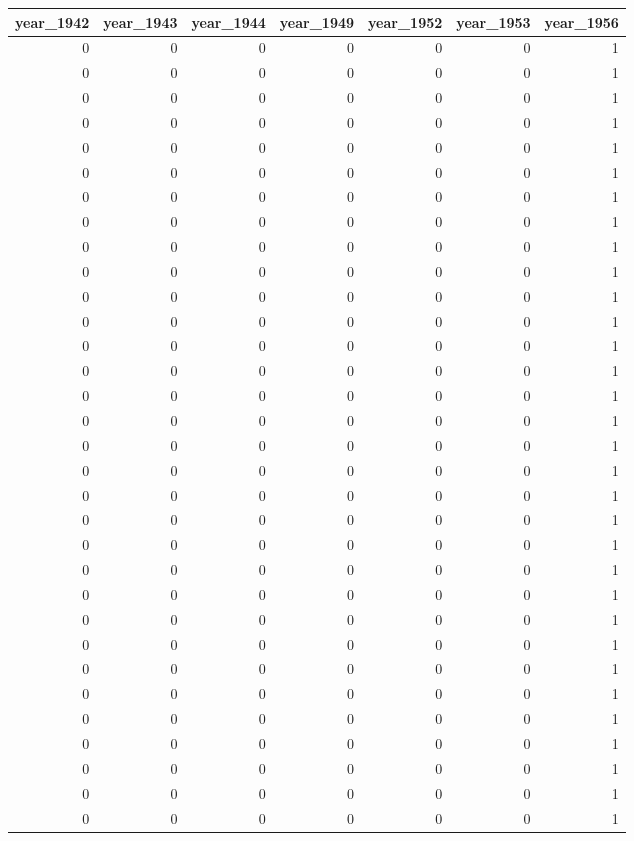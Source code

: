\documentclass[
  12pt,
]{krantz}
\begin{document}
\begin{tabular}{r|r|r|r|r|r|r}
\hline
year\_1942 & year\_1943 & year\_1944 & year\_1949 & year\_1952 & year\_1953 & year\_1956\\
\hline
0 & 0 & 0 & 0 & 0 & 0 & 1\\
\hline
0 & 0 & 0 & 0 & 0 & 0 & 1\\
\hline
0 & 0 & 0 & 0 & 0 & 0 & 1\\
\hline
0 & 0 & 0 & 0 & 0 & 0 & 1\\
\hline
0 & 0 & 0 & 0 & 0 & 0 & 1\\
\hline
0 & 0 & 0 & 0 & 0 & 0 & 1\\
\hline
0 & 0 & 0 & 0 & 0 & 0 & 1\\
\hline
0 & 0 & 0 & 0 & 0 & 0 & 1\\
\hline
0 & 0 & 0 & 0 & 0 & 0 & 1\\
\hline
0 & 0 & 0 & 0 & 0 & 0 & 1\\
\hline
0 & 0 & 0 & 0 & 0 & 0 & 1\\
\hline
0 & 0 & 0 & 0 & 0 & 0 & 1\\
\hline
0 & 0 & 0 & 0 & 0 & 0 & 1\\
\hline
0 & 0 & 0 & 0 & 0 & 0 & 1\\
\hline
0 & 0 & 0 & 0 & 0 & 0 & 1\\
\hline
0 & 0 & 0 & 0 & 0 & 0 & 1\\
\hline
0 & 0 & 0 & 0 & 0 & 0 & 1\\
\hline
0 & 0 & 0 & 0 & 0 & 0 & 1\\
\hline
0 & 0 & 0 & 0 & 0 & 0 & 1\\
\hline
0 & 0 & 0 & 0 & 0 & 0 & 1\\
\hline
0 & 0 & 0 & 0 & 0 & 0 & 1\\
\hline
0 & 0 & 0 & 0 & 0 & 0 & 1\\
\hline
0 & 0 & 0 & 0 & 0 & 0 & 1\\
\hline
0 & 0 & 0 & 0 & 0 & 0 & 1\\
\hline
0 & 0 & 0 & 0 & 0 & 0 & 1\\
\hline
0 & 0 & 0 & 0 & 0 & 0 & 1\\
\hline
0 & 0 & 0 & 0 & 0 & 0 & 1\\
\hline
0 & 0 & 0 & 0 & 0 & 0 & 1\\
\hline
0 & 0 & 0 & 0 & 0 & 0 & 1\\
\hline
0 & 0 & 0 & 0 & 0 & 0 & 1\\
\hline
0 & 0 & 0 & 0 & 0 & 0 & 1\\
\hline
0 & 0 & 0 & 0 & 0 & 0 & 1\\

\end{tabular}
\end{document}
